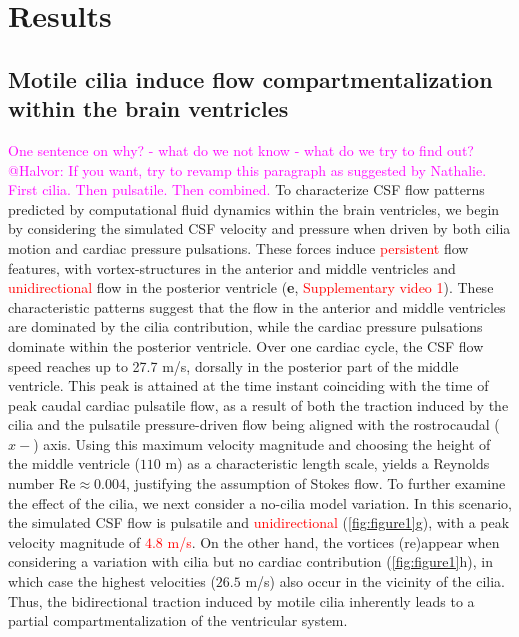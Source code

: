 \documentclass[fleqn]{wlscirep}
\newcommand{\mer}[1]{\textcolor{magenta}{#1}}
\newcommand{\fixme}[1]{\textcolor{red}{#1}}
\begin{document}
\section*{Results}\label{sec:results}

\subsection*{Motile cilia induce flow compartmentalization within the brain ventricles}

\mer{One sentence on why? - what do we not know - what do we try to
  find out?} \mer{@Halvor: If you want, try to revamp this paragraph
  as suggested by Nathalie. First cilia. Then pulsatile. Then
  combined.} To characterize CSF flow patterns predicted by
computational fluid dynamics within the brain ventricles, we begin by
considering the simulated CSF velocity and pressure when driven by
both cilia motion and cardiac pressure pulsations. These forces induce
\fixme{persistent} flow features, with vortex-structures in the
anterior and middle ventricles and \fixme{unidirectional} flow in the
posterior ventricle (\textbf{e},
\fixme{Supplementary video 1}). These characteristic patterns suggest
that the flow in the anterior and middle ventricles are dominated by
the cilia contribution, while the cardiac pressure pulsations dominate
within the posterior ventricle. Over one cardiac cycle, the CSF flow
speed reaches up to 27.7 \textmu m/s, dorsally in the posterior part
of the middle ventricle. This peak is attained at the time instant
coinciding with the time of peak caudal cardiac pulsatile flow, as a
result of both the traction induced by the cilia and the pulsatile
pressure-driven flow being aligned with the rostrocaudal ($x-$)
axis. Using this maximum velocity magnitude and choosing the height of
the middle ventricle ($110$ \textmu m) as a characteristic length
scale, yields a Reynolds number $\mathrm{Re} \approx 0.004$,
justifying the assumption of Stokes flow. To further examine the
effect of the cilia, we next consider a no-cilia model variation. In
this scenario, the simulated CSF flow is pulsatile and
\fixme{unidirectional} (\cref{fig:figure1}g), with a peak velocity
magnitude of \fixme{$4.8$ \textmu m/s}. On the other hand, the
vortices (re)appear when considering a variation with cilia but no
cardiac contribution (\cref{fig:figure1}h), in which case the highest
velocities ($26.5$ \textmu m/s) also occur in the vicinity of the
cilia. Thus, the bidirectional traction induced by motile cilia
inherently leads to a partial compartmentalization of the ventricular
system.
\end{document}
